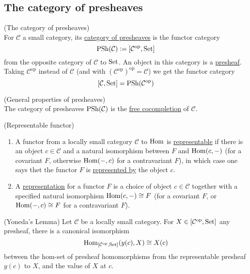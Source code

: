 
\subsection{The category of presheaves}

\begin{definition}{(The category of presheaves)}\\
For $\mathcal{C}$ a small category, its \ul{category of presheaves} is the functor category
\[ \textup{PSh}(\mathcal{C}) := [\mathcal{C}^{\text{op}}, \textup{Set}] \]
from the opposite category of $\mathcal{C}$ to $\textup{Set}$.
An object in this category is a \ul{presheaf}.\\
\noindent Taking $\mathcal{C}^{\text{op}}$ instead of $\mathcal{C}$ (and with $(\mathcal{C}^{\text{op}})^{\text{op}} = \mathcal{C}$) we get the functor category
\[ [\mathcal{C}, \textup{Set}] = \textup{PSh}(\mathcal{C}^{\text{op}}) \]
\end{definition}

\begin{remark}{(General properties of presheaves)}\\
The category of presheaves $\textup{PSh}(\mathcal{C})$ is the \ul{free cocompletion} of $\mathcal{C}$.
\end{remark}

\begin{definition}{(Representable functor)}
\begin{enumerate}
\renewcommand{\labelenumi}{(\theenumi)}
\item A functor from a locally small category $\mathcal{C}$ to $\textup{Hom}$ is \ul{representable} if there is an object $c \in \mathcal{C}$ and a
natural isomorphism between $F$ and $\textup{Hom}(c,-)$ (for a covariant $F$, otherwise $\textup{Hom}(-,c)$ for a contravariant $F$), in which case
one says thet the functor $F$ is \ul{represented by} the object $c$.
\item A \ul{representation} for a functor $F$ is a choice of object $c \in \mathcal{C}$ together with a specified natural isomorphism
$\textup{Hom}(c,-) \cong F$ (for a covariant $F$, or $\textup{Hom}(-,c) \cong F$ for a contravariant $F$).
\end{enumerate}
\end{definition}

\begin{lemma}{(Yoneda's Lemma)}
Let $\mathcal{C}$ be a locally small category. For $X \in [\mathcal{C}^{\text{op}}, \textup{Set}]$ any presheaf, there is a canonical isomorphism
\[
\textup{Hom}_{[\mathcal{C}^{\text{op}}, \textup{Set}]}(y(c), X) \cong X(c)
\]
between the hom-set of presheaf homomorphisms from the representable presheaf $y(c)$ to $X$, and the value of $X$ at $c$.
\end{lemma}

